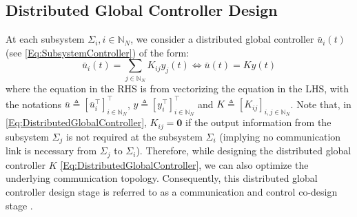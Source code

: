 \documentclass[letterpaper, 10 pt, conference]{ieeeconf}%
\newcommand{\N}{\mathbb{N}}
\newcommand{\T}{\top}
\newcommand{\0}{\mathbf{0}}
\begin{document}
\subsection{Distributed Global Controller Design}

At each subsystem $\Sigma_i, i\in\N_N$, we consider a distributed global controller $\bar{u}_i(t)$ (see \eqref{Eq:SubsystemController}) of the form:
\begin{equation}\label{Eq:DistributedGlobalController}
\bar{u}_i(t) = \sum_{j \in \N_N} K_{ij} y_j(t) \iff \bar{u}(t) = K y(t) 
\end{equation}
where the equation in the RHS is from vectorizing the equation in the LHS, with the notations $\bar{u} \triangleq [\bar{u}_i^\T]_{i\in\N_N}^\T$, $y \triangleq [y_i^\T]_{i\in\N_N}^\T$ and $K\triangleq [K_{ij}]_{i,j\in\N_N}$. 
Note that, in \eqref{Eq:DistributedGlobalController}, $K_{ij}=\0$ if the output information from the subsystem $\Sigma_j$ is not required at the subsystem $\Sigma_i$ (implying no communication link is necessary from $\Sigma_j$ to $\Sigma_i$). Therefore, while designing the distributed global controller $K$ \eqref{Eq:DistributedGlobalController}, we can also optimize the underlying communication topology. Consequently, this distributed global controller design stage is referred to as a communication and control co-design stage \cite{WelikalaP72023}. 
\end{document}
